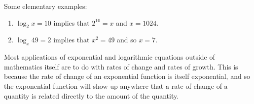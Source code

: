 \begin{ex}
  Some elementary examples:
  \begin{enumerate}
    \item $ \log_2 x = 10 $ implies that $ 2^{10} = x $ and $ x = 1024 $.
    \item $ \log_x 49 = 2 $ implies that $ x^2 = 49 $ and so $ x = 7 $.
  \end{enumerate}
\end{ex}

Most applications of exponential and logarithmic equations outside of mathematics itself are to
do with rates of change and rates of growth. This is because the rate of change of an exponential
function is itself exponential, and so the exponential function will show up anywhere that a rate
of change of a quantity is related directly to the amount of the quantity.

